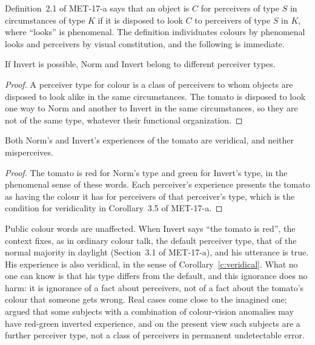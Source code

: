 \documentclass{situationist-preprint}
\begin{document}
Definition~2.1 of MET-17-a says that an object is $C$ for perceivers of type $S$ in circumstances of type $K$ if it is disposed to look $C$ to perceivers of type $S$ in $K$, where \enquote{looks} is phenomenal. The definition individuates colours by phenomenal looks and perceivers by visual constitution, and the following is immediate.

\begin{proposition}\label{p:types}
If Invert is possible, Norm and Invert belong to different perceiver types.
\end{proposition}

\begin{proof}
A perceiver type for colour is a class of perceivers to whom objects are disposed to look alike in the same circumstances. The tomato is disposed to look one way to Norm and another to Invert in the same circumstances, so they are not of the same type, whatever their functional organization.
\end{proof}

\begin{corollary}\label{c:veridical}
Both Norm's and Invert's experiences of the tomato are veridical, and neither misperceives.
\end{corollary}

\begin{proof}
The tomato is red for Norm's type and green for Invert's type, in the phenomenal sense of these words. Each perceiver's experience presents the tomato as having the colour it has for perceivers of that perceiver's type, which is the condition for veridicality in Corollary~3.5 of MET-17-a.
\end{proof}

Public colour words are unaffected. When Invert says \enquote{the tomato is red}, the context fixes, as in ordinary colour talk, the default perceiver type, that of the normal majority in daylight (Section~3.1 of MET-17-a), and his utterance is true. His experience is also veridical, in the sense of Corollary~\ref{c:veridical}. What no one can know is that his type differs from the default, and this ignorance does no harm: it is ignorance of a fact about perceivers, not of a fact about the tomato's colour that someone gets wrong. Real cases come close to the imagined one; \citet{NidaRumelin1996} argued that some subjects with a combination of colour-vision anomalies may have red-green inverted experience, and on the present view such subjects are a further perceiver type, not a class of perceivers in permanent undetectable error.
\end{document}
